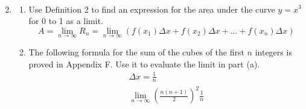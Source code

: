 \documentclass{article}
\begin{document}
\begin{enumerate}
$$\begin{align}
	\end{align}$$
\setcounter{enumi}{21}
	\item \begin{enumerate}
		\item Use Definition 2 to find an expression for the area under the curve $y=x^3$ for 0 to 1 as a limit.
$$A=\lim_{n \to \infty} R_{n} = \lim_{n \to \infty}(f(x_{1})\Delta x + f(x_{2})\Delta x + . . . + f(x_{n})\Delta x)$$
		\item The following formula for the sum of the cubes of the first $n$ integers is proved in Appendix F. Use it to evaluate the limit in part (a).
				$$\begin{align}
\Delta x = \frac{1}{n}\\
		\lim_{n \to \infty}(\frac{n(n+1)}{2})^{2}\frac{1}{n}
			\end{align}
$$
	\end{enumerate}
\end{enumerate}
\end{document}
